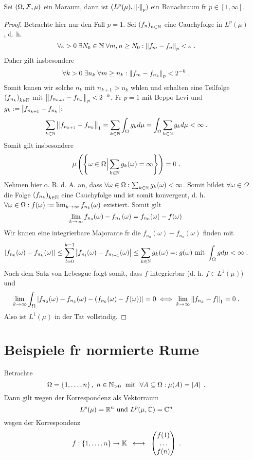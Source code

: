 \begin{theorem}
	Sei \((\Omega, \mathcal{F}, \mu)\) ein Ma\s raum, dann ist \((L^p(\mu), \left\lVert\cdot\right\rVert_{p})\) ein Banachraum f\us r \(p \in [1,\infty]\).
\end{theorem}
\begin{proof}
	Betrachte hier nur den Fall \(p = 1\). Sei \(\left (f_n\right )_{n\in \mathbb{N}}\) eine Cauchyfolge in \(L^p(\mu)\), d. h. 
	\[\forall \varepsilon> 0 \;\exists N_0 \in \mathbb{N} \;\forall m,n \geq N_0: \left\lVert f_m - f_n\right\rVert_{p} < \varepsilon\;.\]
	Daher gilt insbesondere
	\[\forall k > 0 \; \exists n_k \;\forall m \geq n_k : \left\lVert f_m - f_{n_k}\right\rVert_{p} < 2^{-k}\;.\]
	Somit k\os nnen wir solche \(n_k\) mit \(n_{k+1} > n_k\) w\as hlen und erhalten eine Teilfolge \(\left (f_{n_k}\right )_{k\in \mathbb{N}}\) mit \( \left\lVert f_{n_{k+1}} - f_{n_k}\right\rVert_{p} < 2^{-k}\). F\us r \(p = 1 \) mit Beppo-Levi und \(g_k:= \left\lvert f_{n_{k+1}} - f_{n_k} \right\rvert\):
	\[\sum_{k\in\mathbb{N}} \left\lVert f_{n_{k+1}} - f_{n_k}\right\rVert_{1} = \sum_{k\in\mathbb{N}} \int_\Omega g_k d\mu = \int_\Omega \sum_{k\in\mathbb{N}} g_k d\mu < \infty\;.\]
	Somit gilt insbesondere 
	\[\mu\left(\left\{\omega \in \Omega\Big\vert \sum_{k\in\mathbb{N}} g_k(\omega) = \infty\right\}\right) = 0\;.\]
	Nehmen hier o. B. d. A. an, dass \(\forall \omega \in \Omega: \sum_{k\in\mathbb{N}} g_k(\omega) <\infty\). Somit bildet \(\forall \omega\in\Omega\) die Folge \(\left (f_{n_k}\right )_{k\in \mathbb{N}}\) eine Cauchyfolge und ist somit konvergent, d. h. \(\forall \omega \in \Omega: f(\omega) := \lim_{k \to\infty} f_{n_k}(\omega)\) existiert. Somit gilt 
	\[\lim_{k \to\infty} f_{n_0}(\omega) - f_{n_k}(\omega) = f_{n_0}(\omega) - f(\omega)\;\]
	Wir k\os nnen eine integrierbare Majorante f\us r die $f_{n_0}(\omega) - f_{n_k}(\omega)$ finden mit 
	\[\left\lvert f_{n_0}(\omega) - f_{n_k}(\omega) \right\rvert \leq \sum_{l=0}^{k-1}\left\lvert f_{n_l}(\omega) - f_{n_{l+1}}(\omega) \right\rvert \leq \sum_{k\in\mathbb{N}} g_k(\omega) =: g(\omega) \text{ mit }\int_\Omega g d\mu < \infty\;.\]
	Nach dem Satz von Lebesgue folgt somit, dass $f$ integrierbar (d. h. \(f\in L^1(\mu)\)) und 
	\[\lim_{k \to\infty} \int_\Omega \left\lvert  f_{n_0}(\omega) - f_{n_k}(\omega) -( f_{n_0}(\omega) - f(\omega)) \right\rvert = 0 \iff \lim_{k \to\infty} \left\lVert f_{n_k} - f\right\rVert_{1} = 0 \;.\]
	Also ist \(L^1(\mu)\) in der Tat vollst\as ndig.
\end{proof}

\section{Beispiele f\us r normierte R\as ume}

\begin{ex}
	Betrachte 
	\[\Omega = \left\{1,\ldots, n\right\}, \; n\in\mathbb{N}_{>0} \;\text{ mit }\; \forall A \subseteq \Omega: \mu(A) = \left\lvert A \right\rvert\;.\] 
	Dann gilt wegen der Korrespondenz als Vektorraum
	\[L^p(\mu) = \mathbb{R}^n \text{ und } L^p(\mu, \mathbb{C}) = \mathbb{C}^n\]
	wegen der Korrespondenz 
	\[f:\left\{1,\ldots,n\right\} \to \mathbb{K} \;\;\longleftrightarrow\;\; \begin{pmatrix}f(1)\\ \ldots \\ f(n)\end{pmatrix}\;.\]
\end{ex}

